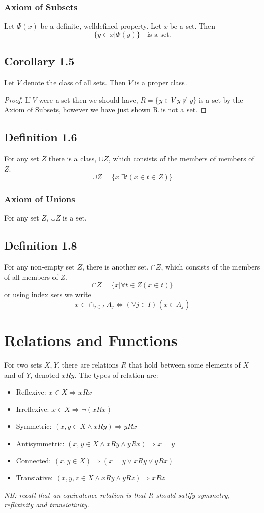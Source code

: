 \documentclass[a4paper, 12pt, twoside]{article}
\begin{document}
\subsubsection*{Axiom of Subsets}
Let $\Phi(x)$ be a definite, welldefined property. Let $x$ be a set. Then
$$ \{y\in x|\Phi(y)\}\quad\text{is a set.}$$
\subsection*{Corollary 1.5}
Let $V$ denote the class of all sets. Then $V$ is a proper class.
\begin{proof}
    If $V$ were a set then we should have, $R=\{y\in V|y\notin y\}$ is a set by the Axiom of Subsets, however we  have just shown R is not a set.
\end{proof}
\subsection*{Definition 1.6}
For any set $Z$ there is a class, $\cup Z$, which consists of the members of members of $Z$.
$$\cup Z=\{x|\exists t (x\in t\in Z)\}$$
\subsubsection*{Axiom of Unions}
For any set $Z$, $\cup Z$ is a set.
\subsection*{Definition 1.8}
For any non-empty set $Z$, there is another set, $\cap Z$, which consists of the members of all members of $Z$.
$$\cap Z=\{x|\forall t\in Z(x\in t)\}$$
or using index sets we write
$$x\in \cap_{j\in I}A_{j}\iff (\forall j\in I)(x \in A_{j}) $$

\newpage
\section{Relations and Functions}
For two sets $X,Y$, there are relations $R$ that hold between some elements of $X$ and of $Y$, denoted $xRy$. The types of relation are:
\begin{itemize}
    \item Reflexive:  $x\in X \Rightarrow xRx$
    \item Irreflexive:  $x\in X \Rightarrow \neg (xRx)$
    \item Symmetric:  $(x,y\in X \wedge xRy) \Rightarrow yRx$
    \item Antisymmetric: $(x,y\in X \wedge xRy  \wedge yRx)\Rightarrow x=y$
    \item Connected:  $(x,y\in X) \Rightarrow (x=y\vee xRy\vee yRx)$
    \item Transiative:  $(x,y,z\in X \wedge xRy \wedge yRz) \Rightarrow xRz$
\end{itemize}
\textit{NB: recall that an \emph{equivalence relation} is that R should satify symmetry, reflixivity and transiativity.}
\end{document}
